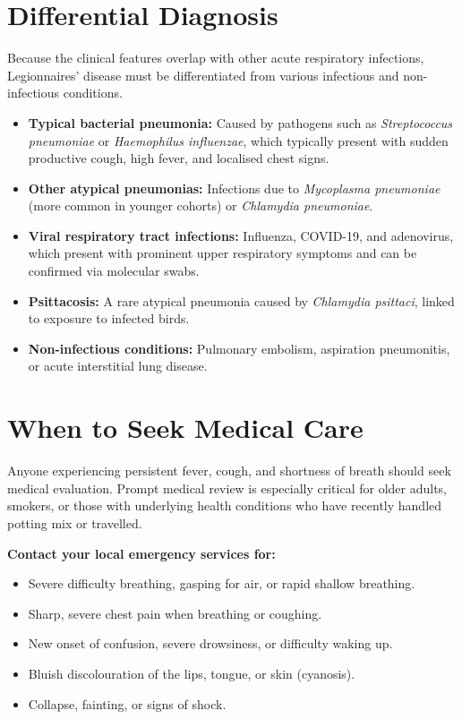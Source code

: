 \section*{Differential Diagnosis}
Because the clinical features overlap with other acute respiratory infections, Legionnaires' disease must be differentiated from various infectious and non-infectious conditions.

\begin{itemize}
    \item \textbf{Typical bacterial pneumonia:} Caused by pathogens such as \textit{Streptococcus pneumoniae} or \textit{Haemophilus influenzae}, which typically present with sudden productive cough, high fever, and localised chest signs.
    \item \textbf{Other atypical pneumonias:} Infections due to \textit{Mycoplasma pneumoniae} (more common in younger cohorts) or \textit{Chlamydia pneumoniae}.
    \item \textbf{Viral respiratory tract infections:} Influenza, COVID-19, and adenovirus, which present with prominent upper respiratory symptoms and can be confirmed via molecular swabs.
    \item \textbf{Psittacosis:} A rare atypical pneumonia caused by \textit{Chlamydia psittaci}, linked to exposure to infected birds.
    \item \textbf{Non-infectious conditions:} Pulmonary embolism, aspiration pneumonitis, or acute interstitial lung disease.
\end{itemize}

\section*{When to Seek Medical Care}
Anyone experiencing persistent fever, cough, and shortness of breath should seek medical evaluation. Prompt medical review is especially critical for older adults, smokers, or those with underlying health conditions who have recently handled potting mix or travelled.

\textbf{Contact your local emergency services for:}
\begin{itemize}
    \item Severe difficulty breathing, gasping for air, or rapid shallow breathing.
    \item Sharp, severe chest pain when breathing or coughing.
    \item New onset of confusion, severe drowsiness, or difficulty waking up.
    \item Bluish discolouration of the lips, tongue, or skin (cyanosis).
    \item Collapse, fainting, or signs of shock.
\end{itemize}

